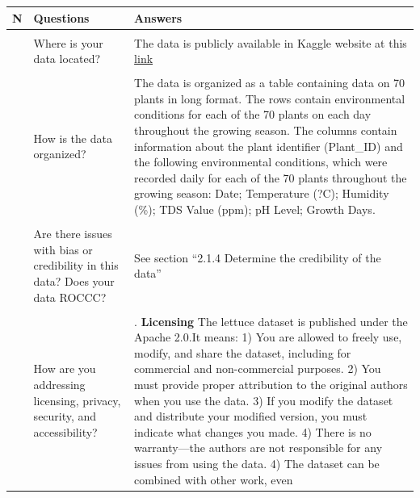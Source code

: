 \documentclass[
]{article}
\begin{document}
\begin{longtable}[]{@{}
  >{\raggedright\arraybackslash}p{}
  >{\raggedright\arraybackslash}p{}
  >{\raggedright\arraybackslash}p{}@{}}
\toprule\noalign{}
\begin{minipage}[b]{\linewidth}\raggedright
N
\end{minipage} & \begin{minipage}[b]{\linewidth}\raggedright
Questions
\end{minipage} & \begin{minipage}[b]{\linewidth}\raggedright
Answers
\end{minipage} \\
\midrule\noalign{}
\endhead
\bottomrule\noalign{}
\endlastfoot
& & \\
1 & Where is your data located? & The data is publicly available in
Kaggle website at this
\href{https://www.kaggle.com/datasets/jurijsruko/lettuce}{link} \\
& & \\
2 & How is the data organized? & The data is organized as a table
containing data on 70 plants in long format. The rows contain
environmental conditions for each of the 70 plants on each day
throughout the growing season. The columns contain information about the
plant identifier (Plant\_ID) and the following environmental conditions,
which were recorded daily for each of the 70 plants throughout the
growing season: Date; Temperature (?C); Humidity (\%); TDS Value (ppm);
pH Level; Growth Days. \\
& & \\
3 & Are there issues with bias or credibility in this data? Does your
data ROCCC? & See section ``2.1.4 Determine the credibility of the
data'' \\
& & \\
4 & How are you addressing licensing, privacy, security, and
accessibility? & 1. \textbf{Licensing} The lettuce dataset is published
under the Apache 2.0.It means: 1) You are allowed to freely use, modify,
and share the dataset, including for commercial and non-commercial
purposes. 2) You must provide proper attribution to the original authors
when you use the data. 3) If you modify the dataset and distribute your
modified version, you must indicate what changes you made. 4) There is
no warranty---the authors are not responsible for any issues from using
the data. 4) The dataset can be combined with other work, even

\end{longtable}
\end{document}
